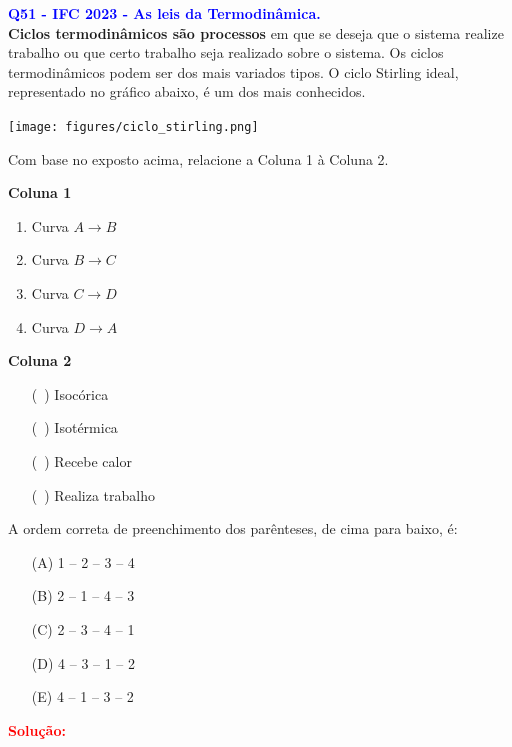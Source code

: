 \documentclass[a4paper,12pt]{article}
\begin{document}
\begin{flushleft}
\textbf{\textcolor{blue}{\Large Q51 - IFC 2023 - As leis da Termodinâmica.}}\\
\noindent
\textbf{Ciclos termodinâmicos são processos} em que se deseja que o sistema realize trabalho ou que certo trabalho seja realizado sobre o sistema. Os ciclos termodinâmicos podem ser dos mais variados tipos. O ciclo Stirling ideal, representado no gráfico abaixo, é um dos mais conhecidos.

\begin{center}
\texttt{[image: figures/ciclo\_stirling.png]}
\end{center}

Com base no exposto acima, relacione a Coluna 1 à Coluna 2.

\textbf{Coluna 1}

\begin{enumerate}
    \item Curva \( A \to B \)
    \item Curva \( B \to C \)
    \item Curva \( C \to D \)
    \item Curva \( D \to A \)
\end{enumerate}

\textbf{Coluna 2}

\begin{enumerate}
    \item[(\ )] Isocórica
    \item[(\ )] Isotérmica
    \item[(\ )] Recebe calor
    \item[(\ )] Realiza trabalho
\end{enumerate}

A ordem correta de preenchimento dos parênteses, de cima para baixo, é:

\begin{itemize}
\item[(A)] 1 -- 2 -- 3 -- 4
\item[(B)] 2 -- 1 -- 4 -- 3
\item[(C)] 2 -- 3 -- 4 -- 1
\item[(D)] 4 -- 3 -- 1 -- 2
\item[(E)] 4 -- 1 -- 3 -- 2
\end{itemize}

\vspace{0.5cm}

\textcolor{red}{\textbf{Solução:}}\\


\end{flushleft}
\end{document}

